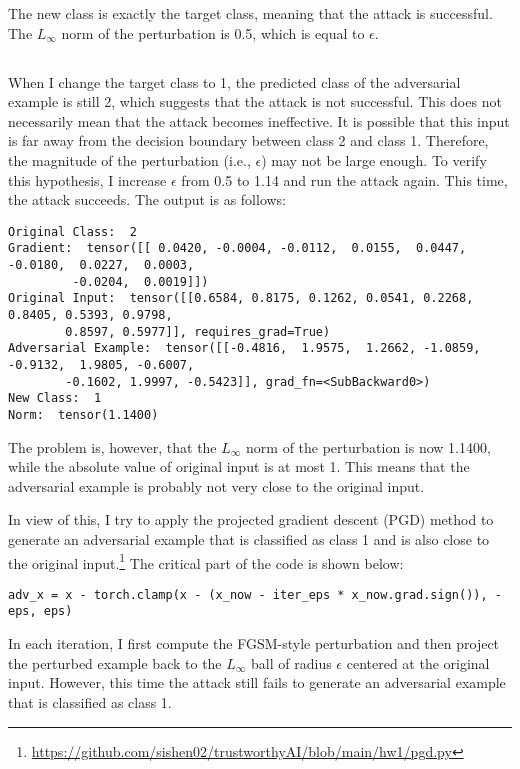 \documentclass[10pt]{article}
\begin{document}
The new class is exactly the target class, meaning that the attack is successful. The $L_\infty$ norm of the perturbation is 0.5, which is equal to $\epsilon$.

\newpage
\subsection{}

When I change the target class to 1, the predicted class of the adversarial example is still 2, which suggests that the attack is not successful. This does not necessarily mean that the attack becomes ineffective. It is possible that this input is far away from the decision boundary between class 2 and class 1. Therefore, the magnitude of the perturbation (i.e., $\epsilon$) may not be large enough. To verify this hypothesis, I increase $\epsilon$ from 0.5 to 1.14 and run the attack again. This time, the attack succeeds. The output is as follows:

\begin{Verbatim}[frame=single]
Original Class:  2
Gradient:  tensor([[ 0.0420, -0.0004, -0.0112,  0.0155,  0.0447, -0.0180,  0.0227,  0.0003,
         -0.0204,  0.0019]])
Original Input:  tensor([[0.6584, 0.8175, 0.1262, 0.0541, 0.2268, 0.8405, 0.5393, 0.9798, 
        0.8597, 0.5977]], requires_grad=True)
Adversarial Example:  tensor([[-0.4816,  1.9575,  1.2662, -1.0859, -0.9132,  1.9805, -0.6007,
        -0.1602, 1.9997, -0.5423]], grad_fn=<SubBackward0>)
New Class:  1
Norm:  tensor(1.1400)
\end{Verbatim}

The problem is, however, that the $L_\infty$ norm of the perturbation is now 1.1400, while the absolute value of original input is at most 1. This means that the adversarial example is probably not very close to the original input.

In view of this, I try to apply the projected gradient descent (PGD) method to generate an adversarial example that is classified as class 1 and is also close to the original input.\footnote{\url{https://github.com/sishen02/trustworthyAI/blob/main/hw1/pgd.py}} The critical part of the code is shown below:

\begin{Verbatim}[frame=single]
adv_x = x - torch.clamp(x - (x_now - iter_eps * x_now.grad.sign()), -eps, eps)
\end{Verbatim}

In each iteration, I first compute the FGSM-style perturbation and then project the perturbed example back to the $L_\infty$ ball of radius $\epsilon$ centered at the original input. However, this time the attack still fails to generate an adversarial example that is classified as class 1.
\end{document}
